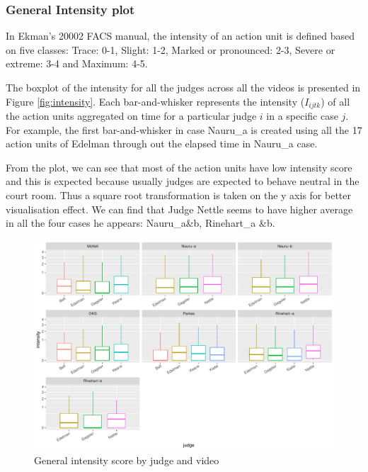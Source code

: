 \documentclass{monashthesis}
\begin{document}
\hypertarget{general-intensity-plot}{%
\subsubsection{General Intensity plot}\label{general-intensity-plot}}

In Ekman's 20002 FACS manual, the intensity of an action unit is defined based on five classes: Trace: 0-1, Slight: 1-2, Marked or pronounced: 2-3, Severe or extreme: 3-4 and Maximum: 4-5.

The boxplot of the intensity for all the judges across all the videos is presented in Figure \ref{fig:intensity}. Each bar-and-whisker represents the intensity (\(I_{ijtk}\)) of all the action units aggregated on time for a particular judge \(i\) in a specific case \(j\). For example, the first bar-and-whisker in case Nauru\_a is created using all the 17 action units of Edelman through out the elapsed time in Nauru\_a case.

From the plot, we can see that most of the action units have low intensity score and this is expected because usually judges are expected to behave neutral in the court room. Thus a square root transformation is taken on the y axis for better visualisation effect. We can find that Judge Nettle seems to have higher average in all the four cases he appears: Nauru\_a\&b, Rinehart\_a \&b.

\begin{figure}

{\centering \includegraphics[width=1\linewidth]{figures/intensity-boxplot-1} 

}

\caption{General intensity score by judge and video\label{fig:intensity}}\label{fig:intensity-boxplot}
\end{figure}
\end{document}
